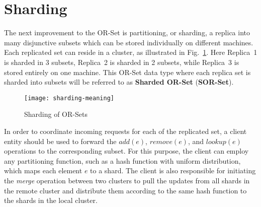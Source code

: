 \section{Sharding}
\label{sec:sharding}

The next improvement to the OR-Set is partitioning, or sharding, a replica into
many disjunctive subsets which can be stored individually on different machines.
Each replicated set can reside in a cluster, as illustrated in
Fig.~\ref{fig:sharding_meaning}. Here Replica~1 is sharded in 3 subsets,
Replica~2 is sharded in 2 subsets, while Replica~3 is stored entirely on one
machine. This OR-Set data type where each replica set is sharded into subsets
will be referred to as \textbf{Sharded OR-Set} (\textbf{SOR-Set}).

\begin{figure}[b]
  \centering
  \texttt{[image: sharding-meaning]}
  \caption{Sharding of OR-Sets}
  \label{fig:sharding_meaning}
\end{figure}

In order to coordinate incoming requests for each of the replicated set, a
client entity should be used to forward the $\textit{add}(e)$,
$\textit{remove}(e)$, and $\textit{lookup}(e)$ operations to the corresponding
subset. For this purpose, the client can employ any partitioning function, such
as a hash function with uniform distribution, which maps each element $e$ to a
shard. The client is also responsible for initiating the \textit{merge}
operation between two clusters to pull the updates from all shards in the remote
cluster and distribute them according to the same hash function to the shards in
the local cluster.

